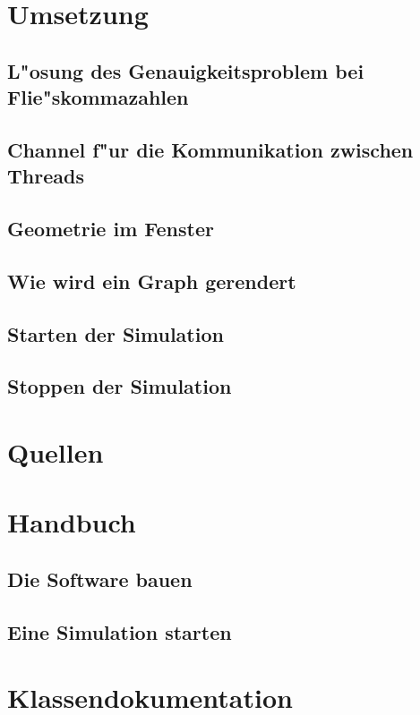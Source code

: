 \documentclass[14pt, a4paper]{report}
\begin{document}
\chapter{Umsetzung}
\section{L"osung des Genauigkeitsproblem bei Flie"skommazahlen}
\section{Channel f"ur die Kommunikation zwischen Threads}
\section{Geometrie im Fenster}
\section{Wie wird ein Graph gerendert}
\section{Starten der Simulation}
\section{Stoppen der Simulation}

\chapter{Quellen}

\appendix
\chapter{Handbuch}
\tableofcontents
\section{Die Software bauen}
\section{Eine Simulation starten}


\chapter{Klassendokumentation}
\newpage
\end{document}
